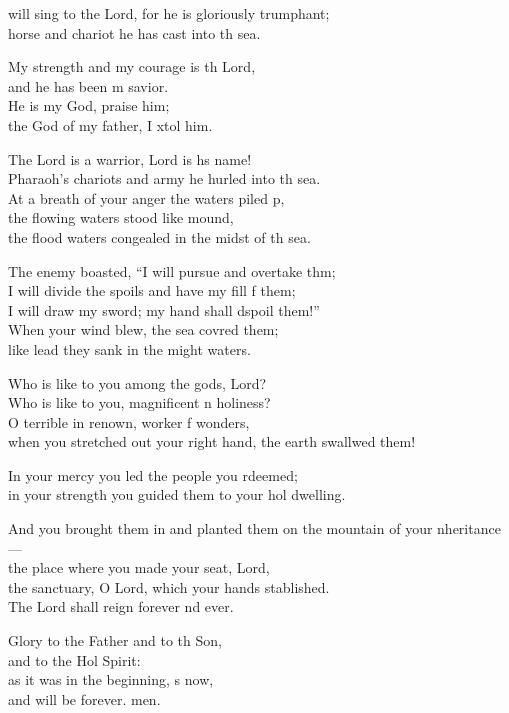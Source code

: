 \begin{psalmverse}
  \begin{patverse}
     will sing to the Lord, for he is gloriously tr\pointup{\i}umphant;\Med\\
horse and chariot he has cast into th sea.

My strength and my courage is th Lord,\Med\\
and he has been m savior.\\
He is my God,  praise him;\Med\\
the God of my father, I xtol him.

The Lord is a warrior, Lord is h\pointup{\i}s name!\Med\\
Pharaoh’s chariots and army he hurled into th sea.\\
At a breath of your anger the waters piled p,\Flex\\
the flowing waters stood like  mound,\Med\\
the flood waters congealed in the midst of th sea.

The enemy boasted, “I will pursue and overtake thm;\Flex\\
I will divide the spoils and have my fill f them;\Med\\
I will draw my sword; my hand shall dspoil them!”\\
When your wind blew, the sea covred them;\Med\\
like lead they sank in the might waters.

Who is like to you among the gods,  Lord?\Med\\
Who is like to you, magnificent \pointup{\i}n holiness?\\
O terrible in renown, worker f wonders,\Med\\
when you stretched out your right hand, the earth swallwed them!

In your mercy you led the people you rdeemed;\Med\\
in your strength you guided them to your hol dwelling.

And you brought them in and planted them on the mountain of your \pointup{\i}nheritance—\Med\\
the place where you made your seat,  Lord,\\
the sanctuary, O Lord, which your hands stablished.\Med\\
The Lord shall reign forever nd ever.

Glory to the Father and to th Son,\Med\\
and to the Hol Spirit:\\
as it was in the beginning, \pointup{\i}s now,\Med\\
and will be forever. men. 
  \end{patverse}
\end{psalmverse}
